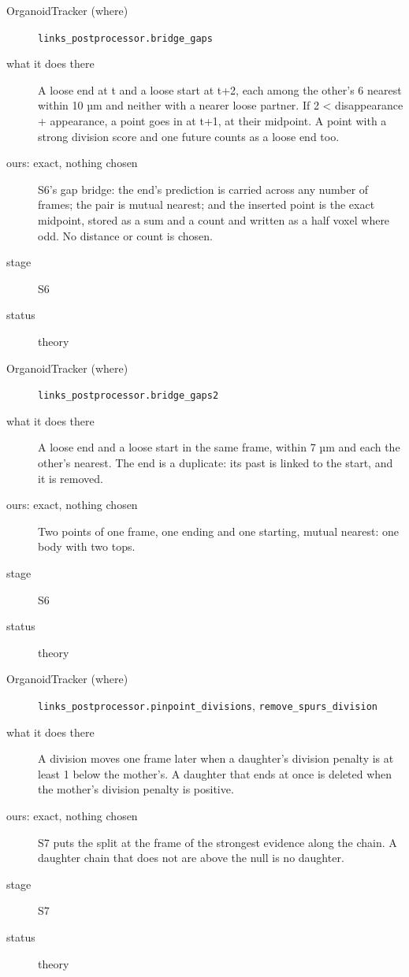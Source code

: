 \begin{description}
\item[{OrganoidTracker (where)}] \texttt{links\_\allowbreak{}postprocessor.\allowbreak{}bridge\_\allowbreak{}gaps}
\item[{what it does there}] A loose end at t and a loose start at t+2, each among the other's 6 nearest within 10 µm and neither with a nearer loose partner. If 2 < disappearance + appearance, a point goes in at t+1, at their midpoint. A point with a strong division score and one future counts as a loose end too.
\item[{ours: exact, nothing chosen}] S6's gap bridge: the end's prediction is carried across any number of frames; the pair is mutual nearest; and the inserted point is the exact midpoint, stored as a sum and a count and written as a half voxel where odd. No distance or count is chosen.
\item[{stage}] S6
\item[{status}] theory
\end{description}

\begin{description}
\item[{OrganoidTracker (where)}] \texttt{links\_\allowbreak{}postprocessor.\allowbreak{}bridge\_\allowbreak{}gaps2}
\item[{what it does there}] A loose end and a loose start in the same frame, within 7 µm and each the other's nearest. The end is a duplicate: its past is linked to the start, and it is removed.
\item[{ours: exact, nothing chosen}] Two points of one frame, one ending and one starting, mutual nearest: one body with two tops.
\item[{stage}] S6
\item[{status}] theory
\end{description}

\begin{description}
\item[{OrganoidTracker (where)}] \texttt{links\_\allowbreak{}postprocessor.\allowbreak{}pinpoint\_\allowbreak{}divisions}, \texttt{remove\_\allowbreak{}spurs\_\allowbreak{}division}
\item[{what it does there}] A division moves one frame later when a daughter's division penalty is at least 1 below the mother's. A daughter that ends at once is deleted when the mother's division penalty is positive.
\item[{ours: exact, nothing chosen}] S7 puts the split at the frame of the strongest evidence along the chain. A daughter chain that does not are above the null is no daughter.
\item[{stage}] S7
\item[{status}] theory
\end{description}

